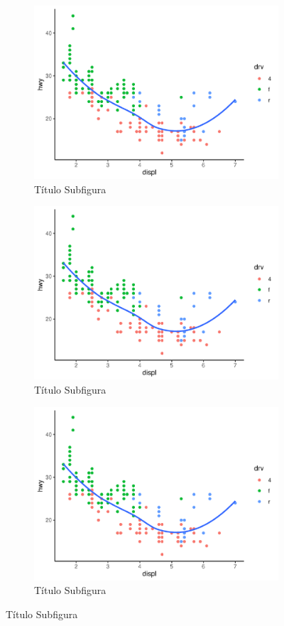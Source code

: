 	\begin{figure}[h]
		\caption{Quadro de Figuras}
		\begin{subfigure}[h]{0.5\textwidth}
			\caption{Título Subfigura}
			\includegraphics[width=\linewidth]{fig/plot2}
		\end{subfigure}
		\begin{subfigure}[h]{0.5\textwidth}
			\caption{Título Subfigura}
			\includegraphics[width=\linewidth]{fig/plot2}
		\end{subfigure}
		\begin{subfigure}[h]{0.5\textwidth}
			\caption{Título Subfigura}
			\includegraphics[width=\linewidth]{fig/plot2}

\end{subfigure}
\end{figure}
